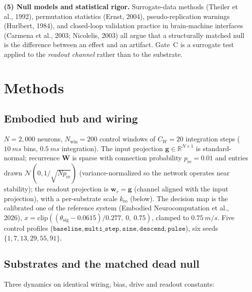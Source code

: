\documentclass[12pt]{article}
\begin{document}
\textbf{(5) Null models and statistical rigor.} Surrogate-data methods
(Theiler et al., 1992), permutation statistics (Ernst, 2004),
pseudo-replication warnings (Hurlbert, 1984), and closed-loop
validation practice in brain-machine interfaces
(Carmena et al., 2003; Nicolelis, 2003) all argue that a structurally matched
null is the difference between an effect and an artifact. Gate~C is a
surrogate test applied to the \emph{readout channel} rather than to the
substrate.

\section{Methods}\label{sec:methods}

\subsection{Embodied hub and wiring}\label{sec:hub}

$N=2{,}000$ neurons, $N_{\mathrm{win}}=200$ control windows of
$C_W=20$ integration steps ($\SI{10}{ms}$ bins, $\SI{0.5}{ms}$
integration). The input projection
$\mathbf{g}\in\mathbb{R}^{N\times1}$ is standard-normal;
recurrence $\mathbf{W}$ is sparse with connection probability
$p_{\mathrm{re}}=0.01$ and entries drawn
$\mathcal{N}(0,1/\sqrt{N p_{\mathrm{re}}})$ (variance-normalized so the
network operates near stability); the readout projection is
$\mathbf{w}_r=\mathbf{g}$ (channel aligned with the input projection),
with a per-substrate scale $k_{\mathrm{ro}}$ (below). The decision map
is the calibrated one of the reference system
(Embodied Neurocomputation et al., 2026),
$\hat{x}=\mathrm{clip}((\theta_{\mathrm{sig}}-0.0615)/0.277,\ 0,\ 0.75)$,
clamped to $\SI{0.75}{m/s}$. Five control profiles
($\mathtt{baseline},\mathtt{multi\_step},\mathtt{sine},\mathtt{descend},
\mathtt{pulse}$), six seeds $\{1,7,13,29,55,91\}$.

\subsection{Substrates and the matched dead null}\label{sec:subs}

Three dynamics on identical wiring, bias, drive and readout constants:
\end{document}
